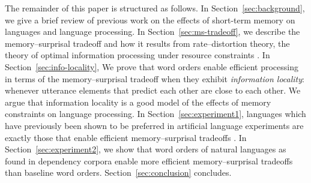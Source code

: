 The remainder of this paper is structured as follows. In Section~\ref{sec:background}, we give a brief review of previous work on the effects of short-term memory on languages and language processing. In Section~\ref{sec:ms-tradeoff}, we describe the memory--surprisal tradeoff and how it results from rate--distortion theory, the theory of optimal information processing under resource constraints \citep{cover2006elements}. In Section~\ref{sec:info-locality}, We prove that word orders enable efficient processing in terms of the memory--surprisal tradeoff when they exhibit \emph{information locality}: whenever utterance elements that predict each other are close to each other. We argue that information locality is a good model of the effects of memory constraints on language processing. In Section~\ref{sec:experiment1}, languages which have previously been shown to be preferred in artificial language experiments are exactly those that enable efficient memory--surprisal tradeoffs \citep{fedzechkina2017human}. In Section~\ref{sec:experiment2}, we show that word orders of natural languages as found in dependency corpora \citep{ud} enable more efficient memory--surprisal tradeoffs than baseline word orders. Section~\ref{sec:conclusion} concludes.



